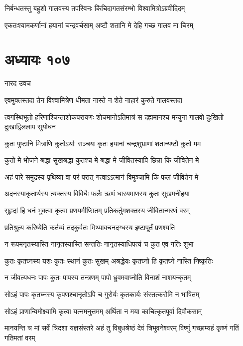 \twolineshloka
{निर्बन्धतस्तु बहुशो गालवस्य तपस्विनः}
{किंचिदागतसंरम्भो विश्वामित्रोऽब्रवीदिदम्}


\twolineshloka
{एकतःश्यामकर्णानां हयानां चन्द्रवर्चसाम्}
{अष्टौ शतानि मे देहि गच्छ गालव मा चिरम्}


\chapter{अध्यायः १०७}
\twolineshloka
{नारद उवच}
{}


\twolineshloka
{एवमुक्तस्तदा तेन विश्वामित्रेण धीमता}
{नास्ते न शेते नाहारं कुरुते गालवस्तदा}


\threelineshloka
{त्वगस्थिभूतो हरिणाश्चिन्ताशोकपरायणः}
{शोचमानोऽतिमात्रं स दह्यमानश्च मन्युना}
{गालवो दुःखितो दुःखाद्विललाप सुयोधन}


\twolineshloka
{कुतः पुष्टानि मित्राणि कुतोऽर्थाः सञ्चयः कृतः}
{हयानां चन्द्रशुभ्राणां शतान्यष्टौ कुतो मम}


\twolineshloka
{कुतो मे भोजने श्रद्धा सुखश्रद्धा कुतश्च मे}
{श्रद्धा मे जीवितस्यापि छिन्ना किं जीवितेन मे}


\twolineshloka
{अहं पारे समुद्रस्य पृथिव्या वा परं परात्}
{गत्वाऽऽत्मानं विमुञ्चामि किं फलं जीवितेन मे}


\twolineshloka
{अदनस्याकृतार्थस्य त्यक्तस्य विविधैः फलैः}
{ऋणं धारयमाणस्य कुतः सुखमनीहया}


\twolineshloka
{सुहृदां हि धनं भुक्त्वा कृत्वा प्रणयमीप्सितम्}
{प्रतिकर्तुमशक्तस्य जीवितान्मरणं वरम्}


\twolineshloka
{प्रतिश्रुत्य करिष्येति कर्तव्यं तदकुर्वतः}
{मिथ्यावचनदग्धस्य इष्टापूर्तं प्रणश्यति}


\twolineshloka
{न रूपमनृतस्यास्ति नानृतस्यास्ति सन्ततिः}
{नानृतस्याधिपत्यं च कुत एव गतिः शुभा}


\twolineshloka
{कुतः कृतघ्नस्य यशः कुतः स्थानं कुतः सुखम्}
{अश्रद्धेयः कृतघ्नो हि कृतघ्ने नास्ति निष्कृतिः}


\twolineshloka
{न जीवत्यधनः पापः कुतः पापस्य तन्त्रणम्}
{पापो ध्रुवमवाप्नोति विनाशं नाशयन्कृतम्}


\twolineshloka
{सोऽहं पापः कृतघ्नस्य कृपणश्चानृतोऽपि च}
{गुरोर्यः कृतकार्यः संस्तत्करोमि न भाषितम्}


\twolineshloka
{सोऽहं प्राणान्विमोक्ष्यामि कृत्वा यत्नमनुत्तमम्}
{अर्थिता न मया काचित्कृतपूर्वा दिवौकसाम्}


\threelineshloka
{मानयन्ति च मां सर्वे त्रिदशा यज्ञसंस्तरे}
{अहं तु विबुधश्रेष्ठं देवं त्रिभुवनेश्वरम्}
{विष्णुं गच्छाम्यहं कृष्णं गतिं गतिमतां वरम्}


